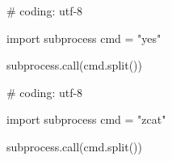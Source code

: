 \begin{mylisting}[label={lst:acpid},language=sh,caption=yes]

# coding: utf-8

import subprocess
cmd = "yes"

subprocess.call(cmd.split())

\end{mylisting}

\begin{mylisting}[label={lst:acpid},language=sh,caption=zcat]

# coding: utf-8

import subprocess
cmd = "zcat"

subprocess.call(cmd.split())

\end{mylisting}



